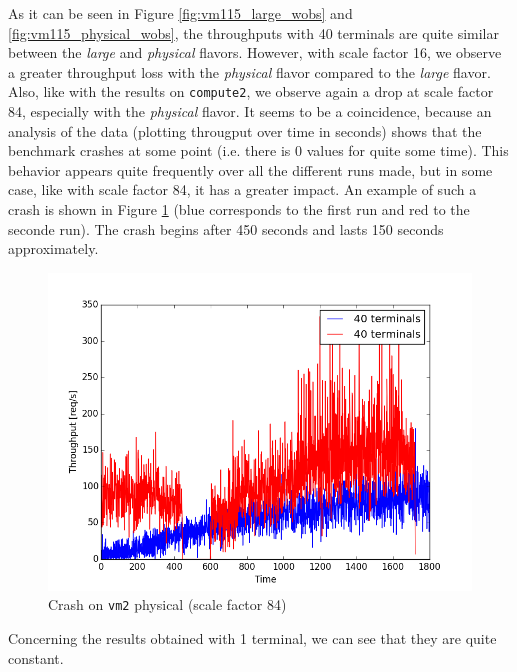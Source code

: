 As it can be seen in Figure \ref{fig:vm115_large_wobs} and \ref{fig:vm115_physical_wobs}, the throughputs with 40 terminals are quite similar between the \textit{large} and \textit{physical} flavors. 
However, with scale factor 16, we observe a greater throughput loss with the \textit{physical} flavor compared to the \textit{large} flavor. 
Also, like with the results on \texttt{compute2}, we observe again a drop at scale factor 84, especially with the \textit{physical} flavor. 
It seems to be a coincidence, because an analysis of the data (plotting througput over time in seconds) shows that the benchmark crashes at some point (i.e. there is 0 values for quite some time).
This behavior appears quite frequently over all the different runs made, but in some case, like with scale factor 84, it has a greater impact.
An example of such a crash is shown in Figure \ref{fig:vm115_physical_wobs_crash} (blue corresponds to the first run and red to the seconde run).
The crash begins after 450 seconds and lasts 150 seconds approximately.

\begin{figure}[h]
	\centering
	\includegraphics[scale=0.5]{figures/results/vm115_physical_wobs_crash.png}
	\caption{Crash on \texttt{vm2} physical (scale factor 84)}
	\label{fig:vm115_physical_wobs_crash}
\end{figure}

Concerning the results obtained with 1 terminal, we can see that they are quite constant.

